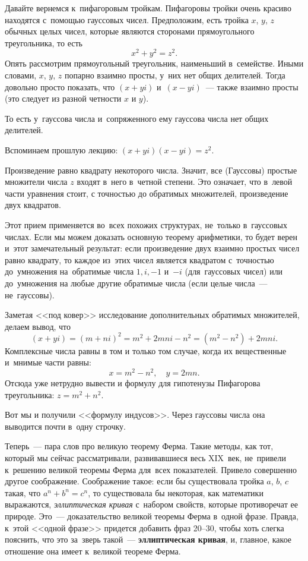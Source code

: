 Давайте вернемся к~пифагоровым тройкам. Пифагоровы тройки очень красиво находятся с~помощью
гауссовых чисел. Предположим, есть тройка $x$, $y$, $z$ обычных целых чисел, которые являются сторонами
прямоугольного треугольника, то есть
$$
x^{2}+y^{2}=z^{2}.
$$
Опять рассмотрим прямоугольный треугольник, наименьший в~семействе. Иными словами, $x$, $y$, $z$ попарно
взаимно просты, у~них нет общих делителей. Тогда довольно просто показать, что
$(x+yi)$ и~$(x-yi)$~--- также взаимно просты (это следует из разной четности $x$ и $y$).

То есть у~гауссова числа и~сопряженного ему гауссова числа нет общих делителей.

Вспоминаем прошлую лекцию: $(x+yi)(x-yi)=z^{2}$.

Произведение равно квадрату некоторого числа. Значит, все (Гауссовы) простые множители числа
$z$ входят в~него в~четной степени. Это означает, что в~левой части уравнения стоит, с точностью
до обратимых множителей, произведение двух квадратов.


Этот прием применяется во~всех похожих структурах, не~только в~гауссовых числах. Если мы можем
доказать основную теорему арифметики, то будет верен и~этот замечательный результат: если произведение
двух взаимно простых чисел равно квадрату, то каждое из~этих чисел является квадратом с~точностью
до~умножения на~обратимые числа $1, i, -1$ и~$-i$ (для~гауссовых чисел) или до~умножения на любые
другие обратимые числа (если целые числа~--- не~гауссовы).


Заметая <<под ковер>> исследование дополнительных обратимых множителей, делаем вывод, что
$$
(x+yi) = (m+ni)^{2} = m^{2}+2mni-n^{2} = (m^{2}-n^{2})+2mni.
$$
Комплексные числа равны в том и только том случае, когда их вещественные и~мнимые части равны:
$$
x= m^{2}-n^{2},\quad
y=2mn.
$$
Отсюда уже нетрудно вывести и формулу для гипотенузы Пифагорова треугольника: $z=m^{2}+n^{2}$.

Вот мы и получили <<формулу индусов>>. Через гауссовы числа она выводится почти в~одну строчку.

Теперь~--- пара слов про великую теорему Ферма. Такие методы, как тот, который мы сейчас рассматривали,
развивавшиеся весь XIX~век, не~привели к~решению великой теоремы Ферма для~всех показателей.
Привело совершенно другое соображение. Соображение такое: если бы существовала тройка $a$, $b$, $c$
такая, что $a^{n}+b^{n} = c^{n}$, то существовала бы некоторая, как математики выражаются, \textit{эллиптическая кривая} с~набором свойств,
которые противоречат ее природе. Это~--- доказательство великой теоремы Ферма в~одной фразе.
Правда, к~этой <<одной фразе>> придется добавить фраз 20--30, чтобы хоть слегка пояснить, что это
за~зверь такой~--- \textbf{эллиптическая кривая}, и, главное, какое отношение она имеет к~великой теореме
Ферма.

